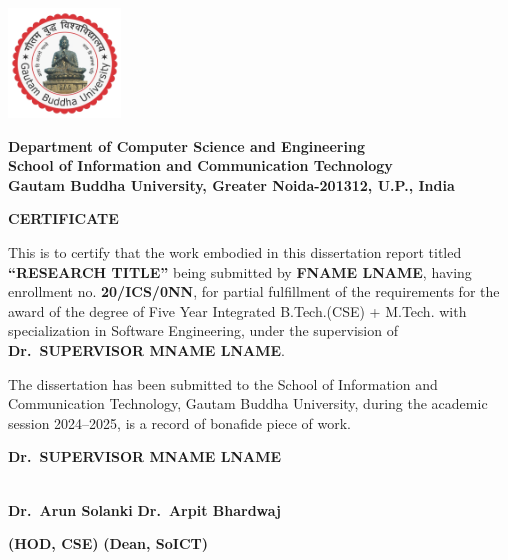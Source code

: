 
\begin{center}
\vspace*{-1.5cm}
        \includegraphics[width=3cm]{figures/GBU_logo.png} %

        {\normalsize\textbf{Department of Computer Science and Engineering\\
        School of Information and Communication Technology\\
        Gautam Buddha University,
        Greater Noida-201312, U.P., India}}\\  %

        \vspace{1cm} %

        {\LARGE \textbf{CERTIFICATE}} %

\end{center}
{
\setlength{\baselineskip}{20pt}

This is to certify that the work embodied in this dissertation report titled \textbf{``RESEARCH TITLE''} being submitted by \textbf{FNAME LNAME}, having enrollment no. \textbf{20/ICS/0NN}, for partial fulfillment of the requirements for the award of the degree of Five Year Integrated B.Tech.(CSE) + M.Tech. with specialization in Software Engineering, under the supervision of \textbf{Dr.~SUPERVISOR MNAME LNAME}.

The dissertation has been submitted to the School of Information and Communication Technology, Gautam Buddha University, during the academic session 2024–2025, is a record of bonafide piece of work.

\vspace{1cm} %
\begin{center}
    \vspace{1cm}
    \textbf{Dr.~SUPERVISOR MNAME LNAME} \\   \\
\end{center}
\vspace{1cm} %
\begin{flushleft}
    \textbf{Dr.~Arun Solanki}  \hfill{\textbf{Dr.~Arpit Bhardwaj}} \\
\end{flushleft}
\vspace{-1.5cm}
\begin{flushleft}
    \textbf{(HOD, CSE)}  \hfill{\textbf{(Dean, SoICT)}} \\
\end{flushleft}


}

\clearpage
